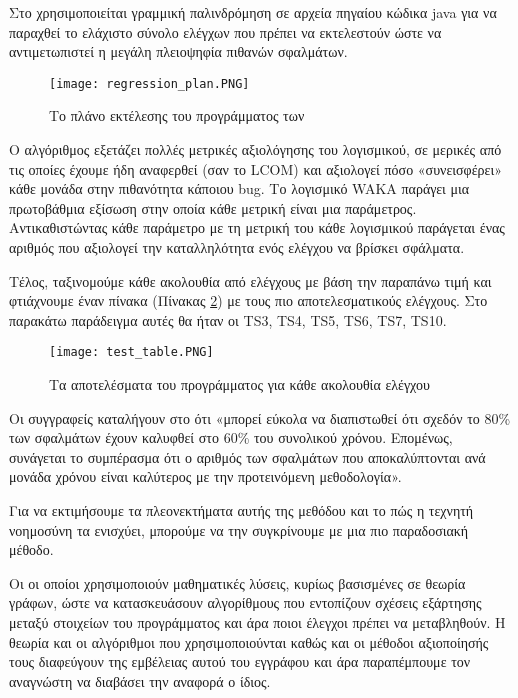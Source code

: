 \documentclass[12pt]{article}
\begin{document}
Στο \textcite{divya} χρησιμοποιείται γραμμική παλινδρόμηση σε αρχεία πηγαίου κώδικα java για να παραχθεί το ελάχιστο σύνολο ελέγχων που πρέπει να εκτελεστούν ώστε να αντιμετωπιστεί η μεγάλη πλειοψηφία πιθανών σφαλμάτων.

\begin{figure}
\label{fig:regression}
\caption{Το πλάνο εκτέλεσης του προγράμματος των \textcite{divya}}
\texttt{[image: regression\_plan.PNG]}
\end{figure}

\par Ο αλγόριθμος εξετάζει πολλές μετρικές αξιολόγησης του λογισμικού, σε μερικές από τις οποίες έχουμε ήδη αναφερθεί (σαν το LCOM) και αξιολογεί πόσο «συνεισφέρει» κάθε μονάδα στην πιθανότητα κάποιου bug. Το λογισμικό WAKA παράγει μια πρωτοβάθμια εξίσωση στην οποία κάθε μετρική είναι μια παράμετρος. Αντικαθιστώντας κάθε παράμετρο με τη μετρική του κάθε λογισμικού παράγεται ένας αριθμός που αξιολογεί την καταλληλότητα ενός ελέγχου να βρίσκει σφάλματα. 

\par Τέλος, ταξινομούμε κάθε ακολουθία από ελέγχους με βάση την παραπάνω τιμή και φτιάχνουμε έναν πίνακα (Πίνακας \ref{fig:test_table}) με τους πιο αποτελεσματικούς ελέγχους. Στο παρακάτω παράδειγμα αυτές θα ήταν οι TS3, TS4, TS5, TS6, TS7, TS10.

\begin{figure}
\label{fig:test_table}
\caption{Τα αποτελέσματα του προγράμματος για κάθε ακολουθία ελέγχου}
\texttt{[image: test\_table.PNG]}
\end{figure}
 
\par Οι συγγραφείς καταλήγουν στο ότι «μπορεί εύκολα να διαπιστωθεί ότι σχεδόν το 80\% των σφαλμάτων έχουν καλυφθεί στο 60\% του συνολικού χρόνου. Επομένως, συνάγεται το συμπέρασμα ότι ο αριθμός των σφαλμάτων που αποκαλύπτονται ανά μονάδα χρόνου είναι καλύτερος με την προτεινόμενη μεθοδολογία».

\par Για να εκτιμήσουμε τα πλεονεκτήματα αυτής της μεθόδου και το πώς η τεχνητή νοημοσύνη τα ενισχύει, μπορούμε να την συγκρίνουμε με μια πιο παραδοσιακή μέθοδο.

\par Οι \textcite{kung} οι οποίοι χρησιμοποιούν μαθηματικές λύσεις, κυρίως βασισμένες σε θεωρία γράφων, ώστε να κατασκευάσουν αλγορίθμους που εντοπίζουν σχέσεις εξάρτησης μεταξύ στοιχείων του προγράμματος και άρα ποιοι έλεγχοι πρέπει να μεταβληθούν. Η θεωρία και οι αλγόριθμοι που χρησιμοποιούνται καθώς και οι μέθοδοι αξιοποίησής τους διαφεύγουν της εμβέλειας αυτού του εγγράφου και άρα παραπέμπουμε τον αναγνώστη να διαβάσει την αναφορά ο ίδιος. 
\end{document}
